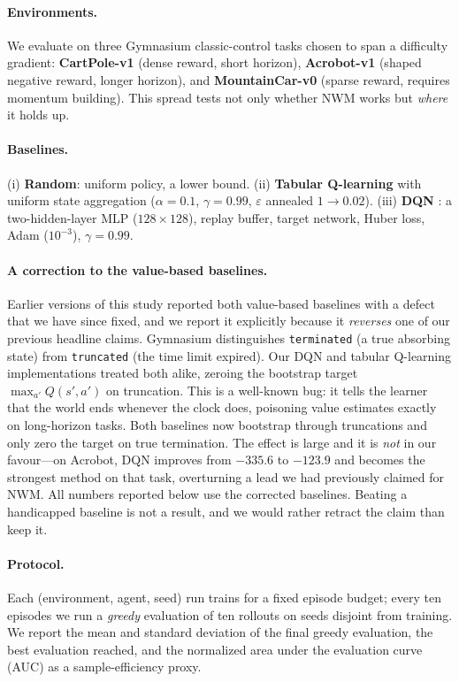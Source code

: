 \documentclass[11pt]{article}
\newcommand{\NWM}{\textsc{NWM}}
\begin{document}
\paragraph{Environments.} We evaluate on three Gymnasium
\citep{towers2024gymnasium} classic-control tasks chosen to span a difficulty
gradient: \textbf{CartPole-v1} (dense reward, short horizon),
\textbf{Acrobot-v1} (shaped negative reward, longer horizon), and
\textbf{MountainCar-v0} (sparse reward, requires momentum building). This spread
tests not only whether \NWM{} works but \emph{where} it holds up.

\paragraph{Baselines.} (i) \textbf{Random}: uniform policy, a lower bound.
(ii) \textbf{Tabular Q-learning} with uniform state aggregation
($\alpha{=}0.1$, $\gamma{=}0.99$, $\varepsilon$ annealed $1\!\to\!0.02$).
(iii) \textbf{DQN} \citep{mnih2015human}: a two-hidden-layer MLP
($128{\times}128$), replay buffer, target network, Huber loss, Adam
($10^{-3}$), $\gamma{=}0.99$.

\paragraph{A correction to the value-based baselines.}
\label{par:truncfix}
Earlier versions of this study reported both value-based baselines with a
defect that we have since fixed, and we report it explicitly because it
\emph{reverses} one of our previous headline claims. Gymnasium distinguishes
\texttt{terminated} (a true absorbing state) from \texttt{truncated} (the
time limit expired). Our DQN and tabular Q-learning implementations treated
both alike, zeroing the bootstrap target $\max_{a'}Q(s',a')$ on truncation.
This is a well-known bug: it tells the learner that the world ends whenever
the clock does, poisoning value estimates exactly on long-horizon tasks. Both
baselines now bootstrap through truncations and only zero the target on true
termination. The effect is large and it is \emph{not} in our favour---on
Acrobot, DQN improves from $-335.6$ to $-123.9$ and becomes the strongest
method on that task, overturning a lead we had previously claimed for
\NWM{}. All numbers reported below use the corrected baselines. Beating a
handicapped baseline is not a result, and we would rather retract the claim
than keep it.

\paragraph{Protocol.} Each (environment, agent, seed) run trains for a fixed
episode budget; every ten episodes we run a \emph{greedy} evaluation of ten
rollouts on seeds disjoint from training. We report the mean and standard
deviation of the final greedy evaluation, the best evaluation reached, and the
normalized area under the evaluation curve (AUC) as a sample-efficiency proxy.
\end{document}
